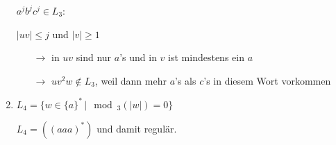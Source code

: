 \documentclass{lehramt-informatik-aufgabe}
\begin{document}
\begin{enumerate}
\begin{liAntwort}
$a^j b^j c^j \in L_3$:

$|uv| \leq j$ und $|v| \geq 1$

\begin{itemize}
\item[$\rightarrow$]
in $uv$ sind nur $a$’s und in $v$ ist mindestens ein $a$

\item[$\rightarrow$]
$u v^2 w \notin L_3$, weil dann mehr $a$’s als $c$’s in diesem Wort
vorkommen
\end{itemize}
\end{liAntwort}


\item $L_4 = \{ w \in \{a\}^* \,|\mod_3(|w|) = 0 \}$

\begin{liAntwort}
$L_4 = ((aaa)^*)$ und damit regulär.
\end{liAntwort}

\end{enumerate}
\end{document}
